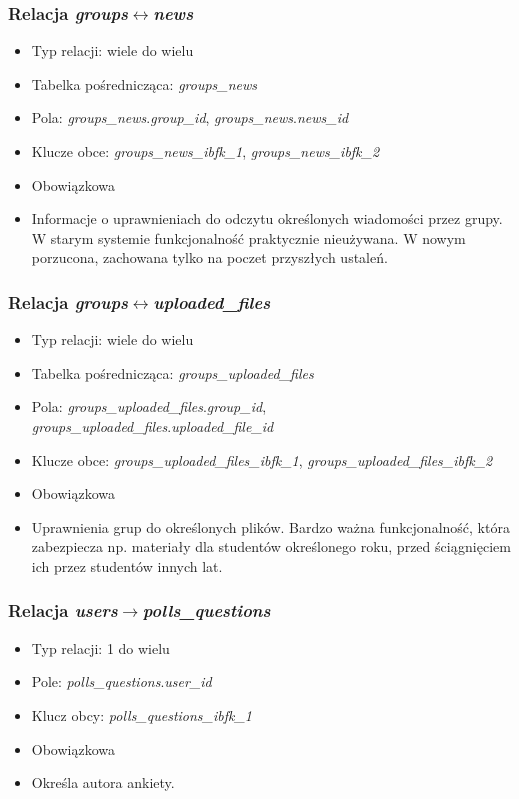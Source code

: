 \documentclass[a4paper,12pt,oneside]{report}
\begin{document}
\subsubsection{Relacja \emph{groups}$\leftrightarrow$\emph{news}}
\label{subsub:groups-news}
\begin{itemize}
  \item Typ relacji: wiele do wielu
  \item Tabelka pośrednicząca: \emph{groups\_news}
  \item Pola: \emph{groups\_news}.\emph{group\_id}, \emph{groups\_news}.\emph{news\_id}
  \item Klucze obce: \emph{groups\_news\_ibfk\_1}, \emph{groups\_news\_ibfk\_2}
  \item Obowiązkowa
  \item Informacje o uprawnieniach do odczytu określonych wiadomości przez grupy. W starym systemie funkcjonalność praktycznie nieużywana. W nowym porzucona, zachowana tylko na poczet przyszłych ustaleń.
\end{itemize}

\subsubsection{Relacja \emph{groups}$\leftrightarrow$\emph{uploaded\_files}}
\label{subsub:groups-uploaded_files}
\begin{itemize}
  \item Typ relacji: wiele do wielu
  \item Tabelka pośrednicząca: \emph{groups\_uploaded\_files}
  \item Pola: \emph{groups\_uploaded\_files}.\emph{group\_id}, \emph{groups\_uploaded\_files}.\emph{uploaded\_file\_id}
  \item Klucze obce: \emph{groups\_uploaded\_files\_ibfk\_1}, \emph{groups\_uploaded\_files\_ibfk\_2}
  \item Obowiązkowa
  \item Uprawnienia grup do określonych plików. Bardzo ważna funkcjonalność, która zabezpiecza np. materiały dla studentów określonego roku, przed ściągnięciem ich przez studentów innych lat.
\end{itemize}

\subsubsection{Relacja \emph{users}$\to$\emph{polls\_questions}}
\label{subsub:users-polls_questions}
\begin{itemize}
  \item Typ relacji: 1 do wielu
  \item Pole: \emph{polls\_questions}.\emph{user\_id}
  \item Klucz obcy: \emph{polls\_questions\_ibfk\_1}
  \item Obowiązkowa
  \item Określa autora ankiety.
\end{itemize}
\end{document}
